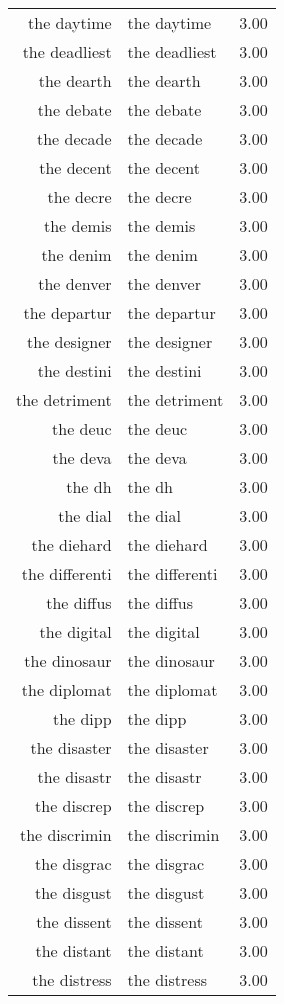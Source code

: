 \begin{table}[ht]
\begin{tabular}{rlr}
  the daytime & the daytime & 3.00 \\ 
  the deadliest & the deadliest & 3.00 \\ 
  the dearth & the dearth & 3.00 \\ 
  the debate & the debate & 3.00 \\ 
  the decade & the decade & 3.00 \\ 
  the decent & the decent & 3.00 \\ 
  the decre & the decre & 3.00 \\ 
  the demis & the demis & 3.00 \\ 
  the denim & the denim & 3.00 \\ 
  the denver & the denver & 3.00 \\ 
  the departur & the departur & 3.00 \\ 
  the designer & the designer & 3.00 \\ 
  the destini & the destini & 3.00 \\ 
  the detriment & the detriment & 3.00 \\ 
  the deuc & the deuc & 3.00 \\ 
  the deva & the deva & 3.00 \\ 
  the dh & the dh & 3.00 \\ 
  the dial & the dial & 3.00 \\ 
  the diehard & the diehard & 3.00 \\ 
  the differenti & the differenti & 3.00 \\ 
  the diffus & the diffus & 3.00 \\ 
  the digital & the digital & 3.00 \\ 
  the dinosaur & the dinosaur & 3.00 \\ 
  the diplomat & the diplomat & 3.00 \\ 
  the dipp & the dipp & 3.00 \\ 
  the disaster & the disaster & 3.00 \\ 
  the disastr & the disastr & 3.00 \\ 
  the discrep & the discrep & 3.00 \\ 
  the discrimin & the discrimin & 3.00 \\ 
  the disgrac & the disgrac & 3.00 \\ 
  the disgust & the disgust & 3.00 \\ 
  the dissent & the dissent & 3.00 \\ 
  the distant & the distant & 3.00 \\ 
  the distress & the distress & 3.00 \\ 

\end{tabular}
\end{table}
